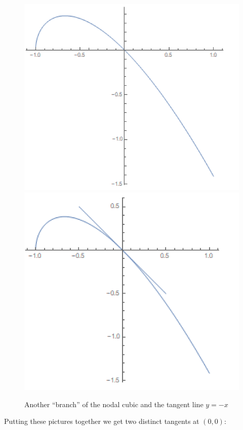 \documentclass[12pt]{article}
\begin{document}
\begin{figure}[!htb]
	\centering
	\includegraphics[scale=0.7]{ag3}
	\includegraphics[scale=0.7]{ag4}
	\caption{Another ``branch'' of the nodal cubic and the tangent line $y=-x$}
\end{figure}
Putting these pictures together we get two distinct tangents at $(0,0)$:
\end{document}
